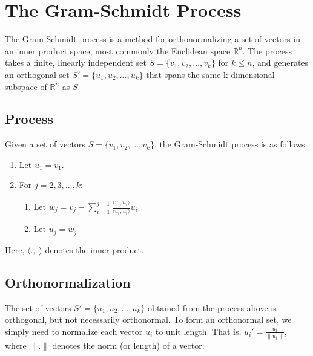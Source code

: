 \chapter{The Gram-Schmidt Process}

The Gram-Schmidt process is a method for orthonormalizing a set of
vectors in an inner product space, most commonly the Euclidean space
$\mathbb{R}^n$. The process takes a finite, linearly independent set
$S = \{v_1, v_2, \ldots, v_k\}$ for $k \leq n$, and generates an
orthogonal set $S' = \{u_1, u_2, \ldots, u_k\}$ that spans the same
k-dimensional subspace of $\mathbb{R}^n$ as $S$.

\section{Process}

Given a set of vectors $S = \{v_1, v_2, \ldots, v_k\}$, the
Gram-Schmidt process is as follows:

\begin{enumerate}
    \item Let $u_1 = v_1$.
    \item For $j = 2, 3, \ldots, k$:
    \begin{enumerate}
        \item Let $w_j = v_j - \sum_{i=1}^{j-1} \frac{\langle v_j, u_i \rangle}{\langle u_i, u_i \rangle} u_i$
        \item Let $u_j = w_j$
    \end{enumerate}
\end{enumerate}

Here, $\langle . , . \rangle$ denotes the inner product. 

\section{Orthonormalization}

The set of vectors $S' = \{u_1, u_2, \ldots, u_k\}$ obtained from the
process above is orthogonal, but not necessarily orthonormal. To form
an orthonormal set, we simply need to normalize each vector $u_i$ to
unit length. That is, $u_i' = \frac{u_i}{\|u_i\|}$, where $\|.\|$
denotes the norm (or length) of a vector.


